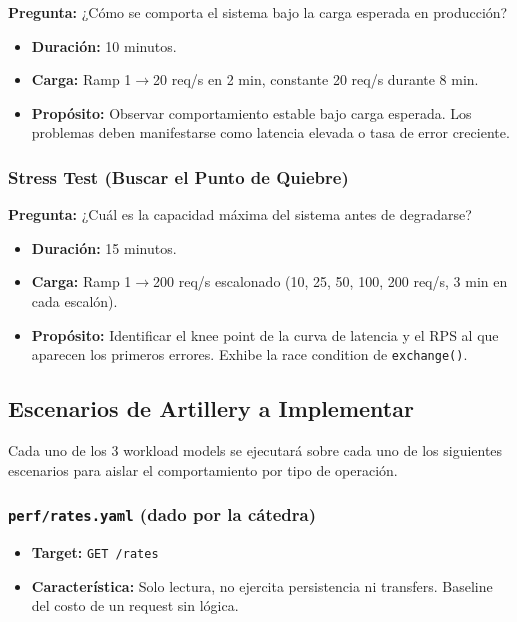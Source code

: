 \textbf{Pregunta:} ¿Cómo se comporta el sistema bajo la carga esperada en producción?

\begin{itemize}[leftmargin=*]
    \item \textbf{Duración:} 10 minutos.
    \item \textbf{Carga:} Ramp 1$\rightarrow$20 req/s en 2 min, constante 20 req/s durante 8 min.
    \item \textbf{Propósito:} Observar comportamiento estable bajo carga esperada. Los problemas deben manifestarse como latencia elevada o tasa de error creciente.
\end{itemize}

\subsubsection{Stress Test (Buscar el Punto de Quiebre)}

\textbf{Pregunta:} ¿Cuál es la capacidad máxima del sistema antes de degradarse?

\begin{itemize}[leftmargin=*]
    \item \textbf{Duración:} 15 minutos.
    \item \textbf{Carga:} Ramp 1$\rightarrow$200 req/s escalonado (10, 25, 50, 100, 200 req/s, 3 min en cada escalón).
    \item \textbf{Propósito:} Identificar el knee point de la curva de latencia y el RPS al que aparecen los primeros errores. Exhibe la race condition de \texttt{exchange()}.
\end{itemize}

\subsection{Escenarios de Artillery a Implementar}

Cada uno de los 3 workload models se ejecutará sobre cada uno de los siguientes escenarios para aislar el comportamiento por tipo de operación.

\subsubsection{\texttt{perf/rates.yaml} (dado por la cátedra)}

\begin{itemize}[leftmargin=*]
    \item \textbf{Target:} \texttt{GET /rates}
    \item \textbf{Característica:} Solo lectura, no ejercita persistencia ni transfers. Baseline del costo de un request sin lógica.
\end{itemize}

